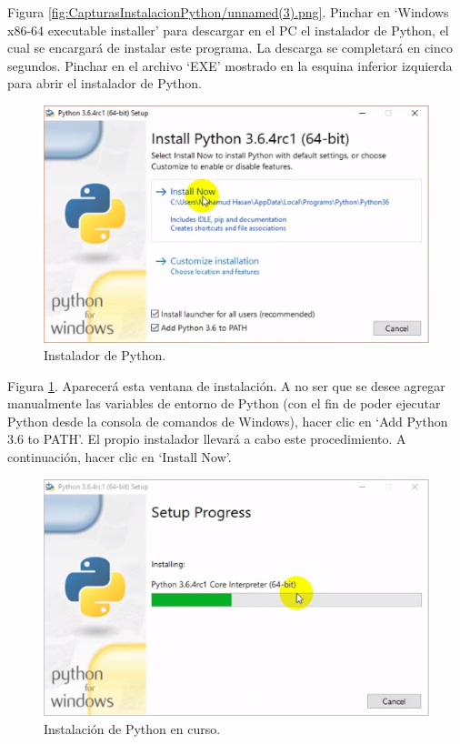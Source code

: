 Figura \ref{fig:CapturasInstalacionPython/unnamed(3).png}. Pinchar en ‘Windows x86-64 executable installer’ para descargar en el PC el instalador de Python, el cual se encargará de instalar este programa. La descarga se completará en cinco segundos. Pinchar en el archivo ‘EXE’ mostrado en la esquina inferior izquierda para abrir el instalador de Python.

\begin{figure}[h!]
  	\centering
	\includegraphics[width=\textwidth]{CapturasInstalacionPython/unnamed(4).png}
	\caption{Instalador de Python.
	\label{fig:CapturasInstalacionPython/unnamed(4).png}}
\end{figure}

Figura \ref{fig:CapturasInstalacionPython/unnamed(4).png}. Aparecerá esta ventana de instalación. A no ser que se desee agregar manualmente las variables de entorno de Python (con el fin de poder ejecutar Python desde la consola de comandos de Windows), hacer clic en ‘Add Python 3.6 to PATH’. El propio instalador llevará a cabo este procedimiento. A continuación, hacer clic en ‘Install Now’.

\begin{figure}[h!]
  	\centering
	\includegraphics[width=\textwidth]{CapturasInstalacionPython/unnamed(5).png}
	\caption{Instalación de Python en curso.
	\label{fig:CapturasInstalacionPython/unnamed(5).png}}
\end{figure}

